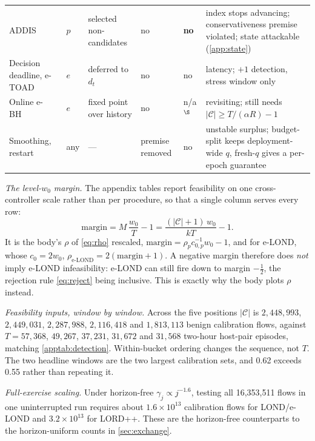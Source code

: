 \documentclass[conference]{IEEEtran}
\newcommand{\Cal}{\mathcal{C}}
\newcommand{\nCal}{\lvert\Cal\rvert}
\newcommand{\ceil}{M}
\begin{document}
\begin{table}[t]
\begin{tabular}{@{}l l p{2.3cm} l l p{4.7cm}@{}}
ADDIS~\cite{tian2019addis} & $p$ & selected non-candidates & no & \textbf{no} & index stops advancing; conservativeness premise violated; state attackable (\cref{app:state}) \\
Decision deadline, e-TOAD~\cite{fisher2022deadlines,xu2026eclosure} & $e$ & deferred to $d_t$ & no & no & latency; $+1$ detection, stress window only \\
Online e-BH~\cite{xu2024elond,fischer2025onlineebh} & $e$ & fixed point over history & no & n/a$^{\S}$ & revisiting; still needs $\nCal\ge T/(\alpha R)-1$ \\
Smoothing, restart & any & --- & premise removed & no & unstable surplus; budget-split keeps
deployment-wide $q$, fresh-$q$ gives a per-epoch guarantee \\
\bottomrule
\end{tabular}
\end{table}

\emph{The level-$w_0$ margin.} The appendix tables report feasibility on one cross-controller scale
rather than per procedure, so that a single column serves every row:
\begin{equation}\label{eq:margin}
\text{margin}=\ceil\,\frac{w_0}{T}-1=\frac{(\nCal+1)\,w_0}{kT}-1 .
\end{equation}
It is the body's $\rho$ of \eqref{eq:rho} rescaled, $\text{margin}=\rho_p c_{0,p}^{-1}w_0-1$, and for
e-LOND, whose $c_0=2w_0$, $\rho_{\text{e-LOND}}=2(\text{margin}+1)$. A negative margin therefore does
\emph{not} imply e-LOND infeasibility: e-LOND can still fire down to margin $-\tfrac12$, the rejection
rule \eqref{eq:reject} being inclusive. This is exactly why the body plots $\rho$ instead.

\emph{Feasibility inputs, window by window.} Across the five positions $\nCal$ is
$2{,}448{,}993$, $2{,}449{,}031$, $2{,}287{,}988$, $2{,}116{,}418$ and $1{,}813{,}113$ benign
calibration flows, against $T=57{,}368$, $49{,}267$, $37{,}231$, $31{,}672$ and $31{,}568$ two-hour
host-pair episodes, matching \cref{apptab:detection}. Within-bucket ordering changes the sequence,
not $T$. The two headline windows are the two largest calibration sets, and 0.62 exceeds
0.55 rather than repeating it.

\emph{Full-exercise scaling.} Under horizon-free $\gamma_j\propto j^{-1.6}$, testing all
16,353,511 flows in one uninterrupted run requires about $1.6\times10^{13}$ calibration flows
for LOND/e-LOND and $3.2\times10^{13}$ for LORD++. These are the horizon-free counterparts to
the horizon-uniform counts in \cref{sec:exchange}.
\end{document}
